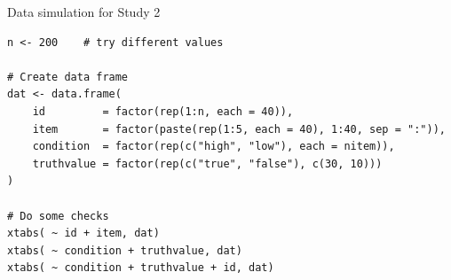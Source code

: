 \documentclass[aspectratio=169]{beamer}
\begin{document}
{

\begin{frame}[fragile]{Data simulation for Study 2}
\begin{lstlisting}
n <- 200    # try different values

# Create data frame
dat <- data.frame(
    id         = factor(rep(1:n, each = 40)),
    item       = factor(paste(rep(1:5, each = 40), 1:40, sep = ":")),
    condition  = factor(rep(c("high", "low"), each = nitem)),
    truthvalue = factor(rep(c("true", "false"), c(30, 10)))
)

# Do some checks
xtabs( ~ id + item, dat)
xtabs( ~ condition + truthvalue, dat)
xtabs( ~ condition + truthvalue + id, dat)
\end{lstlisting}
\end{frame}

}
\end{document}
